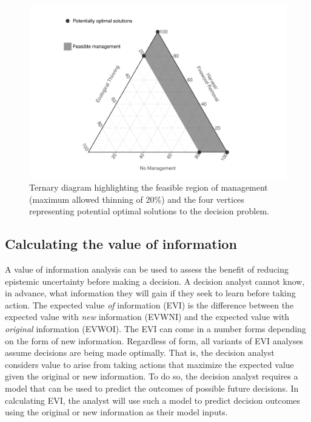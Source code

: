 \documentclass[draft]{article}
\theoremstyle{definition}
\theoremstyle{definition}
\theoremstyle{definition}
\theoremstyle{remark}
\begin{document}
\begin{figure}[htbp]
\centering
\includegraphics{Figure1-1.pdf}
\caption{\label{fig:Figure1}Ternary diagram highlighting the feasible region of
management (maximum allowed thinning of 20\%) and the four vertices
representing potential optimal solutions to the decision problem.}
\end{figure}

\subsection*{Calculating the value of
information}\label{calculating-the-value-of-information}

A value of information analysis can be used to assess the benefit of
reducing epistemic uncertainty before making a decision. A decision
analyst cannot know, in advance, what information they will gain if they
seek to learn before taking action. The expected value \emph{of}
information (EVI) is the difference between the expected value with
\emph{new} information (EVWNI) and the expected value with
\emph{original} information (EVWOI). The EVI can come in a number forms
depending on the form of new information. Regardless of form, all
variants of EVI analyses assume decisions are being made optimally. That
is, the decision analyst considers value to arise from taking actions
that maximize the expected value given the original or new information.
To do so, the decision analyst requires a model that can be used to
predict the outcomes of possible future decisions. In calculating EVI,
the analyst will use such a model to predict decision outcomes using the
original or new information as their model inputs.
\end{document}
